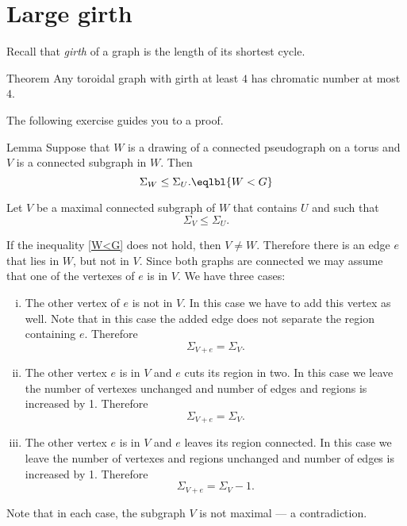 
\section*{Large girth}

Recall that \emph{girth} of a graph is the length of its shortest cycle.

\begin{thm}{Theorem}
Any toroidal graph with girth at least $4$ has chromatic number at most $4$.
\end{thm}

The following exercise guides you to a proof.














\begin{thm}{Lemma}\label{lem:W<G}
Suppose that $W$ is a drawing of a connected pseudograph on a torus and $V$ is a connected subgraph in $W$.
Then 
\[\Sigma_W\le \Sigma_U.\eqlbl{W<G}\]
\end{thm}

 Let $V$ be a maximal connected subgraph of $W$ that contains $U$ and such that 
\[\Sigma_V\le \Sigma_U.\]

If the inequality \ref{W<G} does not hold, then $V\ne W$.
Therefore there is an edge $e$ that lies in $W$, but not in $V$.
Since both graphs are connected we may assume that one of the vertexes of $e$ is in $V$.
We have three cases:
\begin{enumerate}[(i)]
\item The other vertex of $e$ is not in $V$.
In this case we have to add this vertex as well.
Note that in this case the added edge does not separate the region containing $e$.
Therefore 
\[\Sigma_{V+e}=\Sigma_{V}.\]
\item The other vertex $e$ is in $V$ and $e$ cuts its region in two.
In this case we leave the number of vertexes unchanged and number of edges and regions is increased by 1.
Therefore 
\[\Sigma_{V+e}=\Sigma_{V}.\] 
\item\label{p-q+r<p-q+r} The other vertex $e$ is in $V$ and $e$ leaves its region connected.
In this case we leave the number of vertexes and regions unchanged and number of edges is increased by 1.
Therefore 
\[\Sigma_{V+e}=\Sigma_{V}-1.\]
\end{enumerate}
Note that in each case, the subgraph $V$ is not maximal --- a contradiction.

